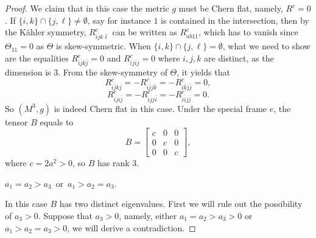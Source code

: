 \documentclass{amsart}
\numberwithin{equation}{section}
\theoremstyle{definition}
\renewcommand{\1}{\mathds{1}}
\renewcommand{\>}{\rightarrow}
\begin{document}
\begin{proof}
We claim that in this case the metric $g$ must be Chern flat, namely, $R^c=0$. If $\{ i,k\} \cap \{ j,\ell\} \neq \emptyset$, say for instance $1$ is contained in the intersection, then by the K\"ahler symmetry, $R^c_{i\overline{j}k\overline{\ell}}$ can be written as $R^c_{a\overline{b}1\overline{1}}$, which has to vanish since $\Theta_{11}=0$ as $\Theta$ is skew-symmetric. When $\{ i,k\} \cap \{ j,\ell\} = \emptyset$, what we need to show are the equalities $R^{c}_{i\overline{j}k\overline{j}}=0$ and $R^{c}_{i\overline{j}i\overline{j}}=0$ where $i,j,k$ are distinct, as the dimension is $3$. From the skew-symmetry of $\Theta$, it yields that
$$ R^c_{i\overline{j}k\overline{j}} = - R^c_{i\overline{j}j\overline{k}} = -R^c_{i\overline{k}j\overline{j}}=0,$$
$$ R^c_{i\overline{j}i\overline{j}} = - R^c_{i\overline{j}j\overline{i}} = -R^c_{i\overline{i}j\overline{j}}=0.$$
So $(M^3,g)$ is indeed Chern flat in this case. Under the special frame $e$, the tensor $B$ equals to
\[B =  \begin{bmatrix} c & 0 & 0 \\ 0 & c & 0 \\ 0 & 0 & c   \end{bmatrix}\!\!,\]
where $c=2a^2>0$, so $B$ has rank $3$.

\vspace{0.15cm}

 $a_1=a_2>a_3\,$ or $\,a_1>a_2=a_3$.

\vspace{0.1cm}

In this case $B$ has two distinct eigenvalues. First we will rule out the possibility of $a_3>0$. Suppose that $a_3>0$,
namely, either $a_1=a_2>a_3>0$ or $a_1>a_2=a_3>0$, we will derive a contradiction.


\end{proof}
\end{document}
